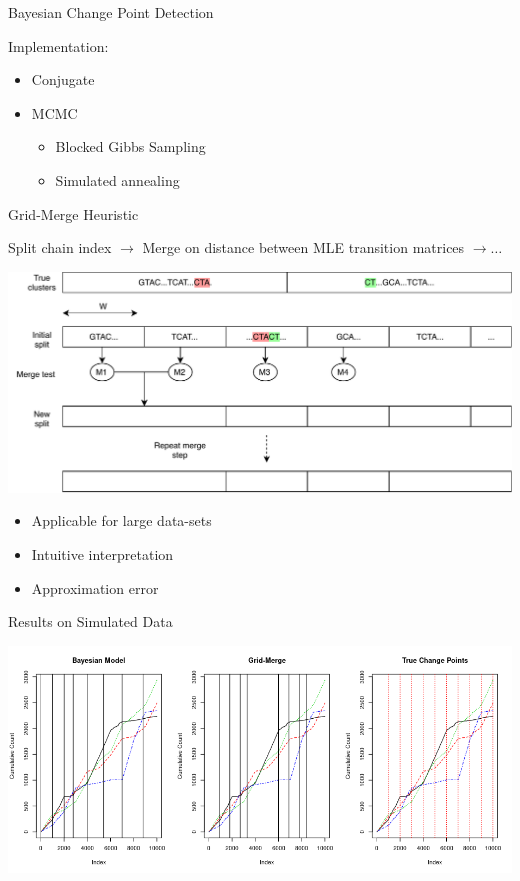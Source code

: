 \documentclass{beamer}
\begin{document}
\begin{frame}{Bayesian Change Point Detection}
\begin{minipage}{.5\linewidth}
Implementation:
\begin{itemize}
	\item Conjugate
	\item MCMC
	\begin{itemize}
		\fontsize{8}{7.2}\selectfont
		\item Blocked Gibbs Sampling
		\item Simulated annealing
	\end{itemize}
\end{itemize}

\end{minipage}
\end{frame}

\begin{frame}{Grid-Merge Heuristic}

Split chain index $\rightarrow$ Merge on distance between MLE transition matrices $\rightarrow \ldots$ \\
\vspace{.5cm}
\centerline{\includegraphics[scale=0.5]{Grid_Merge.pdf}}

\begin{itemize}
	\item Applicable for large data-sets
	\item Intuitive interpretation
	\item Approximation error
\end{itemize}

\end{frame}

\begin{frame}{Results on Simulated Data}
\centerline{\includegraphics[scale=0.5]{comp_hor.png}}
\end{frame}


\begin{frame}


\end{frame}
\end{document}
